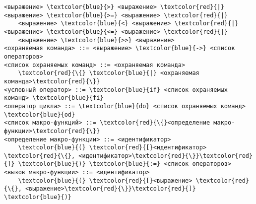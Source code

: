 \begin{Verbatim}[commandchars=\\\{\}]
    <выражение> \textcolor{blue}{>} <выражение> \textcolor{red}{|} <выражение> \textcolor{blue}{>=} <выражение> \textcolor{red}{|}
    <выражение> \textcolor{blue}{<} <выражение> \textcolor{red}{|} <выражение> \textcolor{blue}{<=} <выражение> \textcolor{red}{|}
    <выражение> \textcolor{blue}{>>} <выражение>
<охраняемая команда> ::= <выражение> \textcolor{blue}{->} <список операторов>
<список охраняемых команд> ::= <охраняемая команда> 
    \textcolor{red}{\{} \textcolor{blue}{|} <охраняемая команда>\textcolor{red}{\}}
<условный оператор> ::= \textcolor{blue}{if} <список охраняемых команд> \textcolor{blue}{fi}
<оператор цикла> ::= \textcolor{blue}{do} <список охраняемых команд> \textcolor{blue}{od}
<список макро-функций> ::= \textcolor{red}{\{}<определение макро-функции>\textcolor{red}{\}}
<определение макро-функции> ::= <идентификатор>  
    \textcolor{blue}{(} \textcolor{red}{[}<идентификатор> \textcolor{red}{\{}, <идентификатор>\textcolor{red}{\}}\textcolor{red}{]} \textcolor{blue}{)} \textcolor{blue}{:=} <список операторов>
<вызов макро-функции> ::= <идентификатор> 
    \textcolor{blue}{(} \textcolor{red}{[}<выражение> \textcolor{red}{\{}, <выражение>\textcolor{red}{\}}\textcolor{red}{]} \textcolor{blue}{)}
\end{Verbatim}







